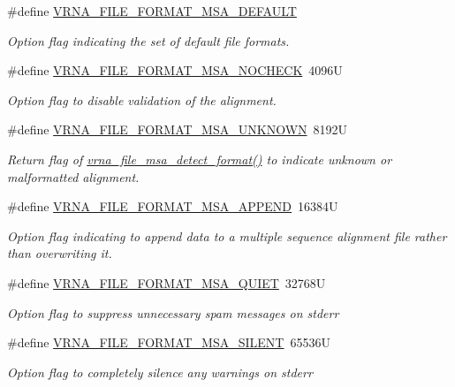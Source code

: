 \begin{DoxyCompactItemize}
\#define \hyperlink{group__file__utils_ga4acc255373831856a8417b68de8a94c0}{V\+R\+N\+A\+\_\+\+F\+I\+L\+E\+\_\+\+F\+O\+R\+M\+A\+T\+\_\+\+M\+S\+A\+\_\+\+D\+E\+F\+A\+U\+LT}
\begin{DoxyCompactList}\small\item\em Option flag indicating the set of default file formats. \end{DoxyCompactList}\item 
\#define \hyperlink{group__file__utils_ga229fb3778ecabea4782902b69fa48fd1}{V\+R\+N\+A\+\_\+\+F\+I\+L\+E\+\_\+\+F\+O\+R\+M\+A\+T\+\_\+\+M\+S\+A\+\_\+\+N\+O\+C\+H\+E\+CK}~4096U
\begin{DoxyCompactList}\small\item\em Option flag to disable validation of the alignment. \end{DoxyCompactList}\item 
\#define \hyperlink{group__file__utils_gabdc948f547e550125de3e7c65878400c}{V\+R\+N\+A\+\_\+\+F\+I\+L\+E\+\_\+\+F\+O\+R\+M\+A\+T\+\_\+\+M\+S\+A\+\_\+\+U\+N\+K\+N\+O\+WN}~8192U
\begin{DoxyCompactList}\small\item\em Return flag of \hyperlink{group__file__utils_ga627ac281b5f11c63861726e6472626c9}{vrna\+\_\+file\+\_\+msa\+\_\+detect\+\_\+format()} to indicate unknown or malformatted alignment. \end{DoxyCompactList}\item 
\#define \hyperlink{group__file__utils_ga1577ea0f497d9c501549c863a4f2c089}{V\+R\+N\+A\+\_\+\+F\+I\+L\+E\+\_\+\+F\+O\+R\+M\+A\+T\+\_\+\+M\+S\+A\+\_\+\+A\+P\+P\+E\+ND}~16384U
\begin{DoxyCompactList}\small\item\em Option flag indicating to append data to a multiple sequence alignment file rather than overwriting it. \end{DoxyCompactList}\item 
\#define \hyperlink{group__file__utils_ga73aa3701a22c5acfcb2e8927287a0554}{V\+R\+N\+A\+\_\+\+F\+I\+L\+E\+\_\+\+F\+O\+R\+M\+A\+T\+\_\+\+M\+S\+A\+\_\+\+Q\+U\+I\+ET}~32768U
\begin{DoxyCompactList}\small\item\em Option flag to suppress unnecessary spam messages on {\ttfamily stderr} \end{DoxyCompactList}\item 
\#define \hyperlink{group__file__utils_gad98ca08968d19f221f29d2a1faf26887}{V\+R\+N\+A\+\_\+\+F\+I\+L\+E\+\_\+\+F\+O\+R\+M\+A\+T\+\_\+\+M\+S\+A\+\_\+\+S\+I\+L\+E\+NT}~65536U
\begin{DoxyCompactList}\small\item\em Option flag to completely silence any warnings on {\ttfamily stderr} \end{DoxyCompactList}\end{DoxyCompactItemize}
